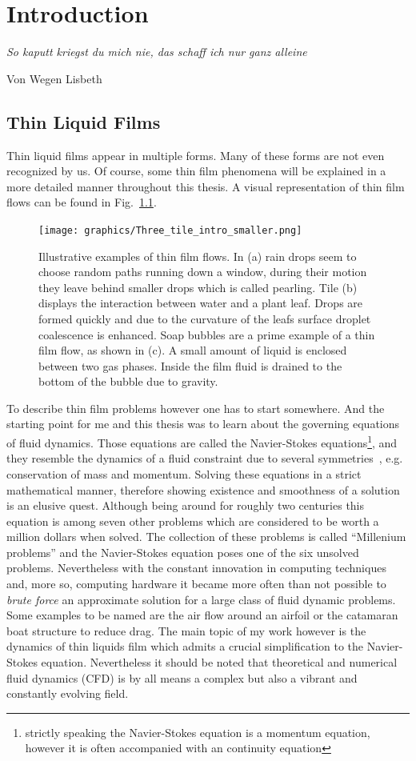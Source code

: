 \chapter{Introduction}
\label{chapter:intro}
\epigraph{\textit{So kaputt kriegst du mich nie, das schaff ich nur ganz alleine}}{Von Wegen Lisbeth}

\section{Thin Liquid Films}
Thin liquid films appear in multiple forms. 
Many of these forms are not even recognized by us.
Of course, some thin film phenomena will be explained in a more detailed manner throughout this thesis. 
A visual representation of thin film flows can be found in Fig.~\ref{fig:examples_intro}.
\begin{figure}
    \centering
    \texttt{[image: graphics/Three\_tile\_intro\_smaller.png]}
    \caption{Illustrative examples of thin film flows. In (a) rain drops seem to choose random paths running down a window, during their motion they leave behind smaller drops which is called pearling. Tile (b) displays the interaction between water and a plant leaf. Drops are formed quickly and due to the curvature of the leafs surface droplet coalescence is enhanced. Soap bubbles are a prime example of a thin film flow, as shown in (c). A small amount of liquid is enclosed between two gas phases. Inside the film fluid is drained to the bottom of the bubble due to gravity.}
    \label{fig:examples_intro}
\end{figure}

To describe thin film problems however one has to start somewhere.
And the starting point for me and this thesis was to learn about the governing equations of fluid dynamics. 
Those equations are called the Navier-Stokes equations\footnote{strictly speaking the Navier-Stokes equation is a momentum equation, however it is often accompanied with an continuity equation}, and they resemble the dynamics of a fluid constraint due to several symmetries~\cite{Navier, Stokes}, e.g. conservation of mass and momentum.
Solving these equations in a strict mathematical manner, therefore showing existence and smoothness of a solution is an elusive quest. 
Although being around for roughly two centuries this equation is among seven other problems which are considered to be worth a million dollars when solved. 
The collection of these problems is called ``Millenium problems'' and the Navier-Stokes equation poses one of the six unsolved problems.
Nevertheless with the constant innovation in computing techniques and, more so, computing hardware it became more often than not possible to \textit{brute force} an approximate solution for a large class of fluid dynamic problems.
Some examples to be named are the air flow around an airfoil or the catamaran boat structure to reduce drag. 
The main topic of my work however is the dynamics of thin liquids film which admits a crucial simplification to the Navier-Stokes equation. 
Nevertheless it should be noted that theoretical and numerical fluid dynamics (CFD) is by all means a complex but also a vibrant and constantly evolving field.

